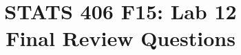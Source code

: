 \documentclass[11pt]{article}
\begin{document}
\title{\Large \bf STATS 406 F15: Lab 12\\Final Review Questions}
\date{}

\maketitle

\begin{enumerate}

\end{enumerate}
\end{document}
